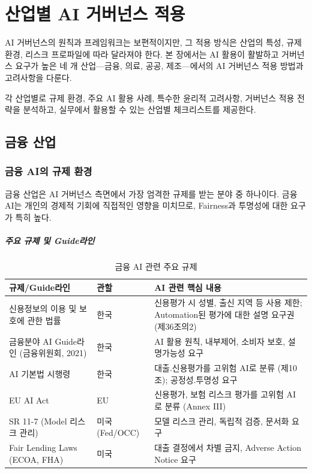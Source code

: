 
\chapter{산업별 AI 거버넌스 적용}
\label{ch:industry_governance}

AI 거버넌스의 원칙과 프레임워크는 보편적이지만, 
그 적용 방식은 산업의 특성, 규제 환경, 리스크 프로파일에 따라 달라져야 한다. 
본 장에서는 AI 활용이 활발하고 거버넌스 요구가 높은 
네 개 산업---금융, 의료, 공공, 제조---에서의 
AI 거버넌스 적용 방법과 고려사항을 다룬다.

각 산업별로 규제 환경, 주요 AI 활용 사례, 
특수한 윤리적 고려사항, 거버넌스 적용 전략을 분석하고, 
실무에서 활용할 수 있는 산업별 체크리스트를 제공한다.


\section{금융 산업}
\label{sec:5.1}

\subsection{금융 AI의 규제 환경}
\label{sec:5.1.1}

금융 산업은 AI 거버넌스 측면에서 가장 엄격한 규제를 받는 분야 중 하나이다. 
금융 AI는 개인의 경제적 기회에 직접적인 영향을 미치므로, 
Fairness과 투명성에 대한 요구가 특히 높다.

\paragraph{주요 규제 및 Guide라인}

\begin{table}[htbp]
\centering
\caption{금융 AI 관련 주요 규제}
\label{tab:financial_regulations}
\begin{tabularx}{\textwidth}{p{3.5cm}p{3cm}X}
\toprule
\textbf{규제/Guide라인} & \textbf{관할} & \textbf{AI 관련 핵심 내용} \\
\midrule
신용정보의 이용 및 보호에 관한 법률 & 
한국 & 
신용평가 시 성별, 출신 지역 등 사용 제한; Automation된 평가에 대한 설명 요구권 (제36조의2) \\
\midrule
금융분야 AI Guide라인 (금융위원회, 2021) & 
한국 & 
AI 활용 원칙, 내부제어, 소비자 보호, 설명가능성 요구 \\
\midrule
AI 기본법 시행령 & 
한국 & 
대출.신용평가를 고위험 AI로 분류 (제10조); 공정성.투명성 요구 \\
\midrule
EU AI Act & 
EU & 
신용평가, 보험 리스크 평가를 고위험 AI로 분류 (Annex III) \\
\midrule
SR 11-7 (Model 리스크 관리) & 
미국 (Fed/OCC) & 
모델 리스크 관리, 독립적 검증, 문서화 요구 \\
\midrule
Fair Lending Laws (ECOA, FHA) & 
미국 & 
대출 결정에서 차별 금지, Adverse Action Notice 요구 \\
\bottomrule
\end{tabularx}
\end{table}


